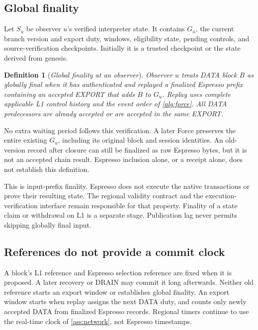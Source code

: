 \documentclass[11pt,a4paper]{article}
\newcommand{\defterm}[1]{\textcolor{rrBlue}{\textit{#1}}}
\newtheorem{definition}{Definition}[section]
\begin{document}
\subsection{Global finality}
\label{sec:global-finality}
Let $S_u$ be observer $u$'s verified interpreter state. It contains $G_u$,
the current branch version and export duty, windows, eligibility state, pending
controls, and source-verification checkpoints.
Initially it is a trusted checkpoint or the state derived from genesis.

\begin{definition}[\defterm{Global finality at an observer}]
\label{def:global-finality}
Observer $u$ treats DATA block $B$ as globally final when it has
authenticated and replayed a finalized Espresso prefix containing an
accepted EXPORT that adds $B$ to $G_u$. Replay uses complete applicable
L1 control history and the event order of \cref{alg:force}. All DATA
predecessors are already accepted or are accepted in the same EXPORT.
\end{definition}

No extra waiting period follows this verification. A later Force
preserves the entire existing $G_u$, including its original block and
session identities. An old-version record after closure can still be
finalized as raw Espresso bytes, but it is not an accepted chain result.
Espresso inclusion alone, or a receipt alone, does not establish this
definition.

This is input-prefix finality. Espresso does not execute the native
transactions or prove their resulting state. The regional validity
contract and the execution-verification interface remain responsible
for that property. Finality of a state claim or withdrawal on L1 is a
separate stage. Publication lag never permits skipping globally final
input.

\subsection{References do not provide a commit clock}
\label{sec:late-receipt}
A block's L1 reference and Espresso selection reference are fixed when
it is proposed. A later recovery or DRAIN may commit it long afterwards.
Neither old reference starts an export window or establishes global
finality. An export window starts when replay assigns the next DATA
duty, and counts only newly accepted DATA from finalized Espresso
records. Regional timers continue to use the real-time clock of
\cref{ass:network}, not Espresso timestamps.
\end{document}
